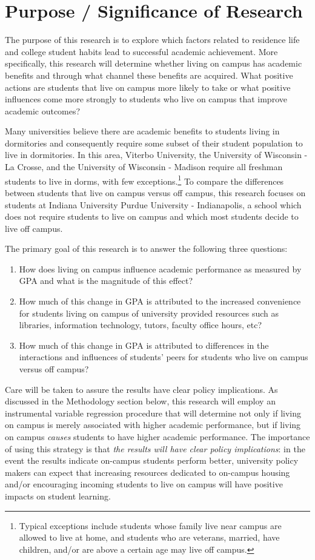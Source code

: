 \documentclass[11pt]{article}
\newcommand{\be}{
  \begin{enumerate}
  \setlength{\itemsep}{0pt}
  \setlength{\parskip}{0pt}
}
\newcommand{\ee}{\end{enumerate}}
\begin{document}
\setcounter{page}{1}

\section{Purpose / Significance of Research}
\indent The purpose of this research is to explore which factors related to residence life and college student habits lead to successful academic achievement.  More specifically, this research will determine whether living on campus has academic benefits and through what channel these benefits are acquired.  What positive actions are students that live on campus more likely to take or what positive influences come more strongly to students who live on campus that improve academic outcomes?

Many universities believe there are academic benefits to students living in dormitories and consequently require some subset of their student population to live in dormitories.  In this area, Viterbo University, the University of Wisconsin - La Crosse, and the University of Wisconsin - Madison require all freshman students to live in dorms, with few exceptions.\footnote{Typical exceptions include students whose family live near campus are allowed to live at home, and students who are veterans, married, have children, and/or are above a certain age may live off campus.}  To compare the differences between students that live on campus versus off campus, this research focuses on students at Indiana University Purdue University - Indianapolis, a school which does not require students to live on campus and which most students decide to live off campus.

The primary goal of this research is to answer the following three questions:
\be
\item How does living on campus influence academic performance as measured by GPA and what is the magnitude of this effect?
\item How much of this change in GPA is attributed to the increased convenience for students living on campus of university provided resources such as libraries, information technology, tutors, faculty office hours, etc?
\item How much of this change in GPA is attributed to differences in the interactions and influences of students' peers for students who live on campus versus off campus?
\ee

Care will be taken to assure the results have clear policy implications.  As discussed in the Methodology section below, this research will employ an instrumental variable regression procedure that will determine not only if living on campus is merely associated with higher academic performance, but if living on campus \textit{causes} students to have higher academic performance.  The importance of using this strategy is that \textit{the results will have clear policy implications}: in the event the results indicate on-campus students perform better, university policy makers can expect that increasing resources dedicated to on-campus housing and/or encouraging incoming students to live on campus will have positive impacts on student learning.
\end{document}
